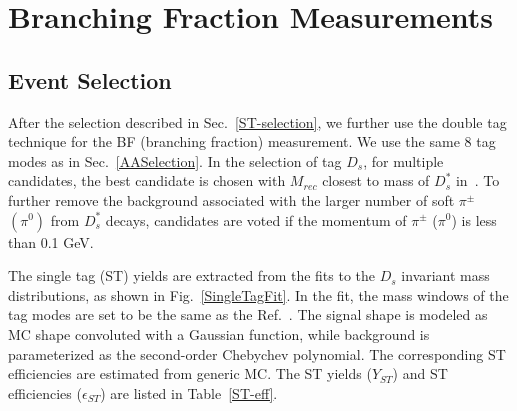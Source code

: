 \section{Branching Fraction Measurements}

\subsection{Event Selection}
\label{BFSelection}
After the selection described in Sec.~\ref{ST-selection}, we further use the double tag technique for the BF (branching fraction) measurement. 
We use the same 8 tag modes as in Sec.~\ref{AASelection}.
In the selection of tag $D_{s}$, for multiple candidates, the best candidate is chosen with $M_{rec}$ closest to mass of $D_{s}^{*}$ in~\cite{PDG2018}.
To further remove the background associated with the larger number of soft $\pi^{\pm}$ $(\pi^{0})$ from $D_{s}^{*}$ decays, candidates are voted if the momentum of $\pi^{\pm}$ ($\pi^{0}$) is less than 0.1 GeV.

The single tag (ST) yields are extracted from the fits to the $D_{s}$ invariant mass distributions, as shown in Fig.~\ref{SingleTagFit}. In the fit, the mass windows of the tag modes are set to be the same as the Ref.~\cite{Doc-DB-630-v35}.
The signal shape is modeled as MC shape convoluted with a Gaussian function, while background is parameterized as the second-order Chebychev polynomial.
The corresponding ST efficiencies are estimated from generic MC. The ST yields ($Y_{ST}$) and ST efficiencies ($\epsilon_{ST}$) are listed in Table~\ref{ST-eff}.

